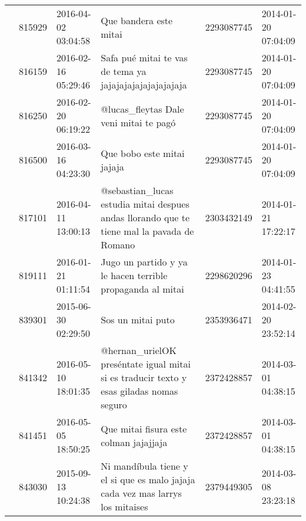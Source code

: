 \begin{tabular}{llllrl}
           & 815929  & 2016-04-02 03:04:58 &                                                                                                                       Que bandera este mitai &  2293087745 & 2014-01-20 07:04:09 \\
           & 816159  & 2016-02-16 05:29:46 &                                                                                      Safa pué mitai te vas de tema ya jajajajajajajajajajaja &  2293087745 & 2014-01-20 07:04:09 \\
           & 816250  & 2016-02-20 06:19:22 &                                                                                                       @lucas\_fleytas Dale veni mitai te pagó &  2293087745 & 2014-01-20 07:04:09 \\
           & 816500  & 2016-03-16 04:23:30 &                                                                                                                   Que bobo este mitai jajaja &  2293087745 & 2014-01-20 07:04:09 \\
           & 817101  & 2016-04-11 13:00:13 &                                                   @sebastian\_lucas estudia mitai despues andas llorando que te tiene mal la pavada de Romano &  2303432149 & 2014-01-21 17:22:17 \\
           & 819111  & 2016-01-21 01:11:54 &                                                                                   Jugo un partido y ya le hacen terrible propaganda al mitai &  2298620296 & 2014-01-23 04:41:55 \\
           & 839301  & 2015-06-30 02:29:50 &                                                                                                                            Sos un mitai puto &  2353936471 & 2014-02-20 23:52:14 \\
           & 841342  & 2016-05-10 18:01:35 &                                                      @hernan\_urielOK preséntate igual mitai si es traducir texto y esas giladas nomas seguro &  2372428857 & 2014-03-01 04:38:15 \\
           & 841451  & 2016-05-05 18:50:25 &                                                                                                       Que mitai fisura este colman jajajjaja &  2372428857 & 2014-03-01 04:38:15 \\
           & 843030  & 2015-09-13 10:24:38 &                                                               Ni mandíbula tiene y el si que es malo jajaja cada vez mas larrys los mitaises &  2379449305 & 2014-03-08 23:23:18 \\

\end{tabular}
